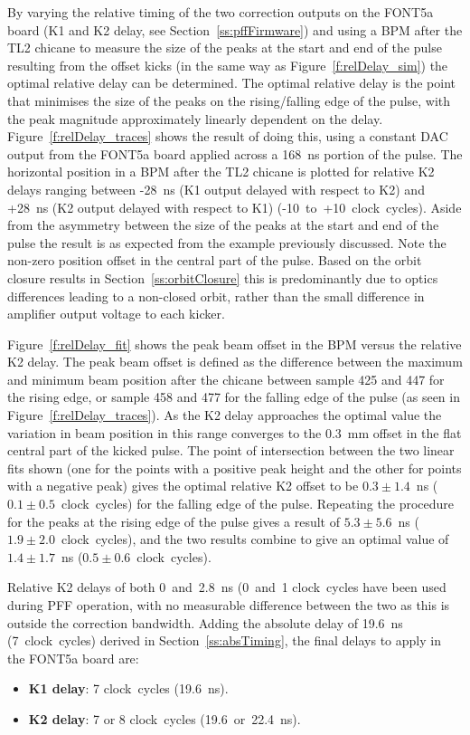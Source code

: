 By varying the relative timing of the two correction outputs on the FONT5a board (K1 and K2 delay, see Section~\ref{ss:pffFirmware}) and using a BPM after the TL2 chicane to measure the size of the peaks at the start and end of the pulse resulting from the offset kicks (in the same way as Figure~\ref{f:relDelay_sim}) the optimal relative delay can be determined. The optimal relative delay is the point that minimises the size of the peaks on the rising/falling edge of the pulse, with the peak magnitude  approximately linearly dependent on the delay. Figure~\ref{f:relDelay_traces} shows the result of doing this, using a constant DAC output from the FONT5a board applied across a 168~ns portion of the pulse. The horizontal position in a BPM after the TL2 chicane is plotted for relative K2 delays ranging between -28~ns (K1 output delayed with respect to K2) and +28~ns (K2 output delayed with respect to K1) (-10~to~+10~clock~cycles). Aside from the asymmetry between the size of the peaks at the start and end of the pulse the result is as expected from the example previously discussed. Note the non-zero position offset in the central part of the pulse. Based on the orbit closure results in Section~\ref{ss:orbitClosure} this is predominantly due to optics differences leading to a non-closed orbit, rather than the small difference in amplifier output voltage to each kicker.

Figure~\ref{f:relDelay_fit} shows the peak beam offset in the BPM versus the relative K2 delay. The peak beam offset is defined as the difference between the maximum and minimum beam position after the chicane between sample 425 and 447 for the rising edge, or sample 458 and 477 for the falling edge of the pulse (as seen in Figure~\ref{f:relDelay_traces}). As the K2 delay approaches the optimal value the variation in beam position in this range converges to the 0.3~mm offset in the flat central part of the kicked pulse. The point of intersection between the two linear fits shown (one for the points with a positive peak height and the other for points with a negative peak) gives the optimal relative K2 offset to be \(0.3\pm1.4\)~ns (\(0.1\pm0.5\)~clock~cycles)  for the falling edge of the pulse. Repeating the procedure for the peaks at the rising edge of the pulse gives a result of \(5.3\pm5.6\)~ns (\(1.9\pm2.0\)~clock~cycles), and the two results combine to give an optimal value of \(1.4\pm1.7\)~ns (\(0.5\pm0.6\)~clock~cycles).

Relative K2 delays of both 0~and~2.8~ns (0~and~1 clock~cycles have been used during PFF operation, with no measurable difference between the two as this is outside the correction bandwidth. Adding the absolute delay of 19.6~ns (7~clock~cycles) derived in Section~\ref{ss:absTiming}, the final delays to apply in the FONT5a board are:
\begin{itemize}
\item \textbf{K1 delay}: 7 clock~cycles (19.6~ns).
\item \textbf{K2 delay}: 7 or 8 clock~cycles (19.6~or~22.4~ns).
\end{itemize}

